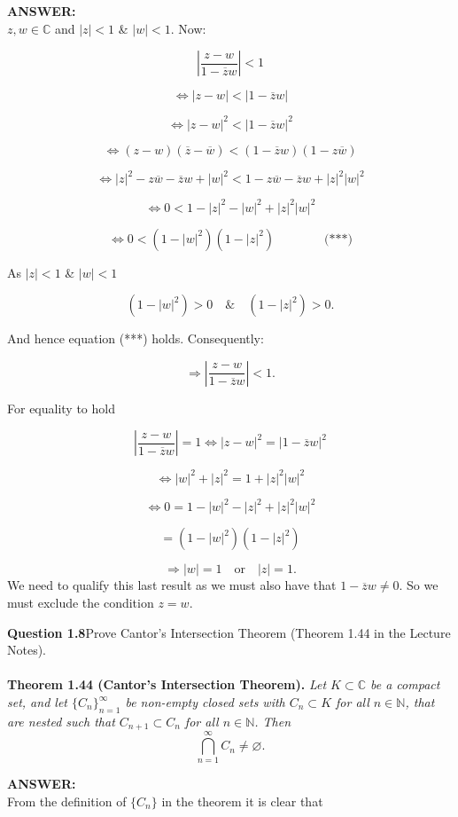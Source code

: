 \documentclass[12pt,a4paper]{article}
\newcommand{\answer}{\vspace{3\baselineskip}\textbf{ANSWER:}}
\newcommand{\question}[2]{\textbf{Question #1}\quad #2}
\begin{document}
\answer\\

$z,w\in\mathbb{C}$ and $|z|<1$ \& $|w|<1$.  Now:

\[
\left|\frac{z-w}{1-\overline{z}w}\right|<1
\]

\[
\Leftrightarrow |z-w|<|1-\overline{z}w|
\]

\[
\Leftrightarrow |z-w|^2<|1-\overline{z}w|^2
\]

\[
\Leftrightarrow (z-w)(\overline{z}-\overline{w})
<
(1-\overline{z}w)(1-z\overline{w})
\]

\[
\Leftrightarrow
|z|^2-z\overline{w}-\overline{z}w+|w|^2
<
1-z\overline{w}-\overline{z}w+|z|^2|w|^2
\]

\[
\Leftrightarrow
0 < 1-|z|^2-|w|^2+|z|^2|w|^2
\]

\[
\Leftrightarrow
0<(1-|w|^2)(1-|z|^2) \quad \quad \quad \quad \text{(***)}
\]

As $|z|<1$ \& $|w|<1$

\[
(1-|w|^2)>0
\quad \&
\quad
(1-|z|^2)>0.
\]

And hence equation (***) holds.  Consequently:

\[
\Rightarrow
\left|\frac{z-w}{1-\overline{z}w}\right|<1.
\]

For equality to hold

\[
\left|\frac{z-w}{1-\overline{z}w}\right|=1
\Leftrightarrow
|z-w|^2=|1-\overline{z}w|^2
\]

\[
\Leftrightarrow
|w|^2+|z|^2=1+|z|^2|w|^2
\]

\[
\Leftrightarrow
0=1-|w|^2-|z|^2+|z|^2|w|^2
\]

\[
=(1-|w|^2)(1-|z|^2)
\]

\[
\Rightarrow |w|=1 \quad \text{or} \quad |z|=1.
\]
We need to qualify this last result as we must also have that $1 - \overline{z}w \ne 0$.
So we must exclude the condition $z=w$.

\newpage

\question{1.8}{Prove Cantor's Intersection Theorem (Theorem 1.44 in the Lecture Notes).}\\
\\
\textbf{Theorem 1.44 (Cantor's Intersection Theorem).}
\textit{Let $K\subset\mathbb{C}$ be a compact set, and let
$\{C_n\}_{n=1}^{\infty}$ be non-empty closed sets with
$C_n\subset K$ for all $n\in\mathbb{N}$, that are nested such that
$C_{n+1}\subset C_n$ for all $n\in\mathbb{N}$.
Then
\[
\bigcap_{n=1}^{\infty} C_n \neq \varnothing.
\]
}

\answer\\
From the definition of $\{C_n\}$ in the theorem it is clear that
\end{document}
